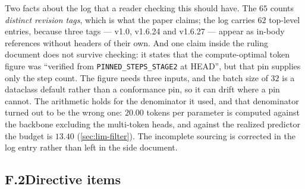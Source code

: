 Two facts about the log that a reader checking this should have. The $65$ counts \emph{distinct
revision tags}, which is what the paper claims; the log carries $62$ top-level entries, because
three tags --- v1.0, v1.6.24 and v1.6.27 --- appear as in-body references without headers of their
own. And one claim inside the ruling document does not survive checking: it states that the
compute-optimal token figure was ``verified from \texttt{PINNED\_STEPS\_STAGE2} at HEAD'', but that
pin supplies only the step count. The figure needs three inputs, and the batch size of $32$ is a
dataclass default rather than a conformance pin, so it can drift where a pin cannot. The
arithmetic holds for the denominator it used, and that denominator turned out to be the wrong
one: $20.00$ tokens per parameter is computed against the backbone excluding the multi-token
heads, and against the realized predictor the budget is $13.40$ (\cref{sec:lim-filter}). The
incomplete sourcing is corrected in the log entry rather than left in the side document.

\subsection*{F.2\quad Directive items}

